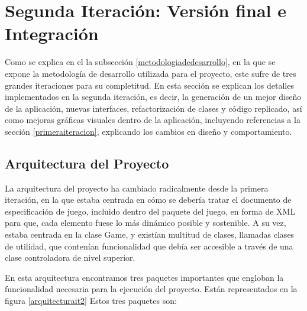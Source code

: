 \chapter{Segunda Iteración: Versión final e Integración}

Como se explica en el la subsección \ref{metodologiadedesarrollo}, en la que se expone la metodología de desarrollo utilizada para el proyecto, este sufre de tres grandes iteraciones para su completitud. En esta sección se explican los detalles implementados en la segunda iteración, es decir, la generación de un mejor diseño de la aplicación, nuevas interfaces, refactorización de clases y código replicado, así como mejoras gráficas visuales dentro de la aplicación, incluyendo referencias a la sección \ref{primeraiteracion}, explicando los cambios en diseño y comportamiento.

\section{Arquitectura del Proyecto}
\label{it2arquitectura}

La arquitectura del proyecto ha cambiado radicalmente desde la primera iteración, en la que estaba centrada en cómo se debería tratar el documento de especificación de juego, incluido dentro del paquete del juego, en forma de XML para que, cada elemento fuese lo más dinámico posible y sostenible. A su vez, estaba centrada en la clase Game, y existían multitud de clases, llamadas clases de utilidad, que contenían funcionalidad que debía ser accesible a través de una clase controladora de nivel superior.

En esta arquitectura encontramos tres paquetes importantes que engloban la funcionalidad necesaria para la ejecución del proyecto. Están representados en la figura \ref{arquitecturait2} Estos tres paquetes son:

